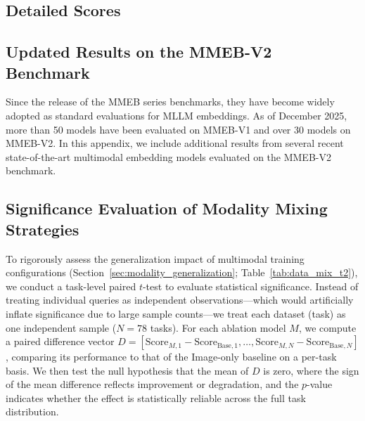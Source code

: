 


\subsection{Detailed Scores}
\label{sec::full_score_table}



\clearpage

\subsection{Updated Results on the MMEB-V2 Benchmark}
Since the release of the MMEB series benchmarks, they have become widely adopted as standard evaluations for MLLM embeddings. As of December 2025, more than 50 models have been evaluated on MMEB-V1 and over 30 models on MMEB-V2. In this appendix, we include additional results from several recent state-of-the-art multimodal embedding models evaluated on the MMEB-V2 benchmark.





\clearpage

\subsection{Significance Evaluation of Modality Mixing Strategies}
\label{sec:significance_test}



To rigorously assess the generalization impact of multimodal training configurations (Section~\ref{sec:modality_generalization}; Table~\ref{tab:data_mix_t2}), we conduct a task-level paired $t$-test to evaluate statistical significance. Instead of treating individual queries as independent observations—which would artificially inflate significance due to large sample counts—we treat each dataset (task) as one independent sample ($N=78$ tasks). For each ablation model $M$, we compute a paired difference vector $D=[\text{Score}_{M,1}-\text{Score}_{\text{Base},1},\dots,\text{Score}_{M,N}-\text{Score}_{\text{Base},N}]$, comparing its performance to that of the Image-only baseline on a per-task basis. We then test the null hypothesis that the mean of $D$ is zero, where the sign of the mean difference reflects improvement or degradation, and the $p$-value indicates whether the effect is statistically reliable across the full task distribution.


